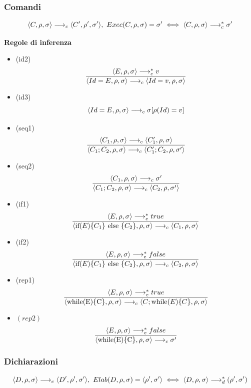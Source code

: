 \documentclass{article}
\begin{document}
\subsubsection{Comandi}
\[\langle C,\rho,\sigma \rangle \longrightarrow_c \langle C',\rho',\sigma' \rangle,\ Exec(C,\rho,\sigma) = \sigma' \iff \langle C,\rho,\sigma \rangle \longrightarrow_c^* \sigma'\]

\noindent\textbf{Regole di inferenza}
\begin{itemize}
    \item (id2)
          \[\frac
              {\langle E,\rho,\sigma \rangle \longrightarrow_c^* v}
              {\langle Id = E,\rho,\sigma \rangle \longrightarrow_c \langle Id = v,\rho,\sigma \rangle}\]
    \item (id3)
          \[\langle Id = E,\rho,\sigma \rangle \longrightarrow_c \sigma[\rho(Id) = v]\]

    \item (seq1)
          \[\frac
              {\langle C_1,\rho,\sigma \rangle \longrightarrow_c \langle C_1',\rho,\sigma \rangle}
              {\langle C_1;C_2,\rho,\sigma \rangle \longrightarrow_c \langle C_1';C_2,\rho,\sigma' \rangle}\]
    \item (seq2)
          \[\frac
              {\langle C_1,\rho,\sigma \rangle \longrightarrow_c \sigma'}
              {\langle C_1;C_2,\rho,\sigma \rangle \longrightarrow_c \langle C_2,\rho,\sigma' \rangle}\]

    \item (if1)
          \[\frac
              {\langle E,\rho,\sigma \rangle \longrightarrow_e^* true}
              {\langle \text{if($E$)\{$C_1$\} else \{$C_2$\}},\rho,\sigma \rangle \longrightarrow_c \langle C_1,\rho,\sigma \rangle}\]
    \item (if2)
          \[\frac
              {\langle E,\rho,\sigma \rangle \longrightarrow_e^* false}
              {\langle \text{if($E$)\{$C_1$\} else \{$C_2$\}},\rho,\sigma \rangle \longrightarrow_c \langle C_2,\rho,\sigma \rangle}\]

    \item (rep1)
          \[\frac
              {\langle E,\rho,\sigma \rangle \longrightarrow_e^* true}
              {\langle \text{while(E)\{C\}},\rho,\sigma \rangle \longrightarrow_c \langle C;\text{while($E$)\{$C$\}},\rho,\sigma \rangle}\]
    \item \((rep2)\)
          \[\frac
              {\langle E,\rho,\sigma \rangle \longrightarrow_e^* false}
              {\langle \text{while(E)\{C\}},\rho,\sigma \rangle \longrightarrow_c \sigma'}\]
\end{itemize}

\subsubsection{Dichiarazioni}
\[\langle D,\rho,\sigma \rangle \longrightarrow_e \langle D',\rho',\sigma' \rangle,\ Elab(D,\rho,\sigma) = \langle \rho',\sigma' \rangle \iff \langle D,\rho,\sigma \rangle \longrightarrow_d^* (\rho',\sigma')\]
\end{document}

